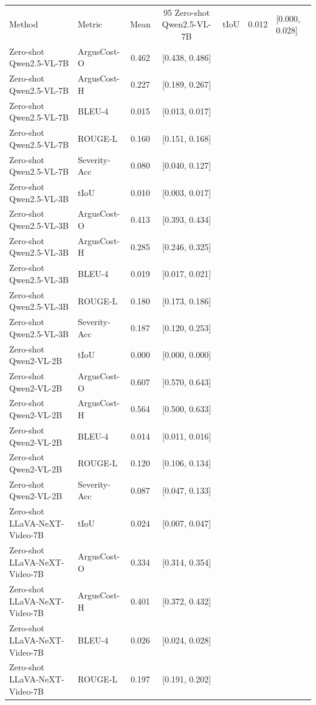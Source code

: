 \begin{tabular}{l l c c}
\toprule
Method & Metric & Mean & 95%
\midrule
Zero-shot Qwen2.5-VL-7B & tIoU & 0.012 & [0.000, 0.028] \\
Zero-shot Qwen2.5-VL-7B & ArgusCost-O & 0.462 & [0.438, 0.486] \\
Zero-shot Qwen2.5-VL-7B & ArgusCost-H & 0.227 & [0.189, 0.267] \\
Zero-shot Qwen2.5-VL-7B & BLEU-4 & 0.015 & [0.013, 0.017] \\
Zero-shot Qwen2.5-VL-7B & ROUGE-L & 0.160 & [0.151, 0.168] \\
Zero-shot Qwen2.5-VL-7B & Severity-Acc & 0.080 & [0.040, 0.127] \\
Zero-shot Qwen2.5-VL-3B & tIoU & 0.010 & [0.003, 0.017] \\
Zero-shot Qwen2.5-VL-3B & ArgusCost-O & 0.413 & [0.393, 0.434] \\
Zero-shot Qwen2.5-VL-3B & ArgusCost-H & 0.285 & [0.246, 0.325] \\
Zero-shot Qwen2.5-VL-3B & BLEU-4 & 0.019 & [0.017, 0.021] \\
Zero-shot Qwen2.5-VL-3B & ROUGE-L & 0.180 & [0.173, 0.186] \\
Zero-shot Qwen2.5-VL-3B & Severity-Acc & 0.187 & [0.120, 0.253] \\
Zero-shot Qwen2-VL-2B & tIoU & 0.000 & [0.000, 0.000] \\
Zero-shot Qwen2-VL-2B & ArgusCost-O & 0.607 & [0.570, 0.643] \\
Zero-shot Qwen2-VL-2B & ArgusCost-H & 0.564 & [0.500, 0.633] \\
Zero-shot Qwen2-VL-2B & BLEU-4 & 0.014 & [0.011, 0.016] \\
Zero-shot Qwen2-VL-2B & ROUGE-L & 0.120 & [0.106, 0.134] \\
Zero-shot Qwen2-VL-2B & Severity-Acc & 0.087 & [0.047, 0.133] \\
Zero-shot LLaVA-NeXT-Video-7B & tIoU & 0.024 & [0.007, 0.047] \\
Zero-shot LLaVA-NeXT-Video-7B & ArgusCost-O & 0.334 & [0.314, 0.354] \\
Zero-shot LLaVA-NeXT-Video-7B & ArgusCost-H & 0.401 & [0.372, 0.432] \\
Zero-shot LLaVA-NeXT-Video-7B & BLEU-4 & 0.026 & [0.024, 0.028] \\
Zero-shot LLaVA-NeXT-Video-7B & ROUGE-L & 0.197 & [0.191, 0.202] \\

\end{tabular}

